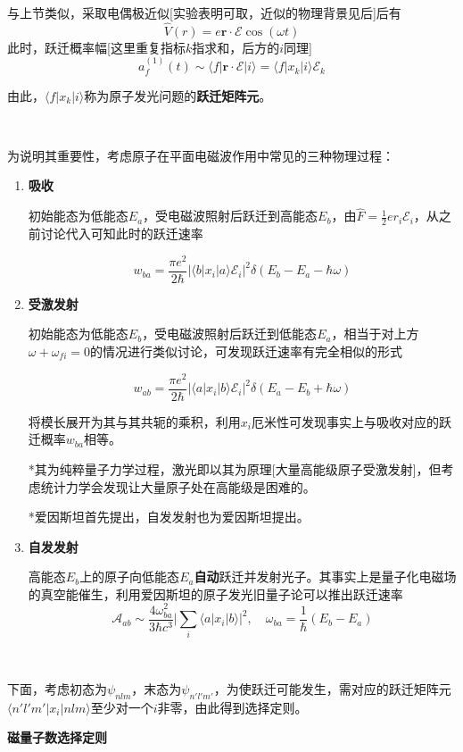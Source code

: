 \documentclass[a4paper,UTF8,fontset=windows]{ctexart}
\newcommand*{\blk}[3]{\langle#1|#2|#3\rangle}
\newcommand*{\br}{\mathbf{r}}
\begin{document}
与上节类似，采取电偶极近似[实验表明可取，近似的物理背景见后]后有
$$\hat{V}(r)=e\br\cdot\mathcal{E}\cos(\omega t)$$
此时，跃迁概率幅[这里重复指标$k$指求和，后方的$i$同理]
$$a_f^{(1)}(t)\sim\blk{f}{\br\cdot\mathcal{E}}{i}=\blk{f}{x_k}{i}{\mathcal{E}}_k$$

由此，$\blk{f}{x_k}{i}$称为原子发光问题的\textbf{跃迁矩阵元}。

\

为说明其重要性，考虑原子在平面电磁波作用中常见的三种物理过程：
\begin{enumerate}
    \item \textbf{吸收}
    
    初始能态为低能态$E_a$，受电磁波照射后跃迁到高能态$E_b$，由$\hat{F}=\frac{1}{2}er_i\mathcal{E}_i$，从之前讨论代入可知此时的跃迁速率

    $$w_{ba}=\frac{\pi e^2}{2\hbar}|\blk{b}{x_i}{a}\mathcal{E}_i|^2\delta(E_b-E_a-\hbar\omega)$$

    \item \textbf{受激发射}
    
    初始能态为低能态$E_b$，受电磁波照射后跃迁到低能态$E_a$，相当于对上方$\omega+\omega_{fi}=0$的情况进行类似讨论，可发现跃迁速率有完全相似的形式

    $$w_{ab}=\frac{\pi e^2}{2\hbar}|\blk{a}{x_i}{b}\mathcal{E}_i|^2\delta(E_a-E_b+\hbar\omega)$$

    将模长展开为其与其共轭的乘积，利用$x_i$厄米性可发现事实上与吸收对应的跃迁概率$w_{ba}$相等。

    *其为纯粹量子力学过程，激光即以其为原理[大量高能级原子受激发射]，但考虑统计力学会发现让大量原子处在高能级是困难的。

    *爱因斯坦首先提出，自发发射也为爱因斯坦提出。

    \item \textbf{自发发射}

    高能态$E_b$上的原子向低能态$E_a$\textbf{自动}跃迁并发射光子。其事实上是量子化电磁场的真空能催生，利用爱因斯坦的原子发光旧量子论可以推出跃迁速率
    $$\mathcal{A}_{ab}\sim\frac{4\omega_{ba}^2}{3\hbar c^3}\bigg|\sum_i\blk{a}{x_i}{b}\bigg|^2,\quad\omega_{ba}=\frac{1}{\hbar}(E_b-E_a)$$
\end{enumerate}

\

下面，考虑初态为$\psi_{nlm}$，末态为$\psi_{n'l'm'}$，为使跃迁可能发生，需对应的跃迁矩阵元$\blk{n'l'm'}{x_i}{nlm}$至少对一个$i$非零，由此得到选择定则。

\textbf{磁量子数选择定则}
\end{document}
